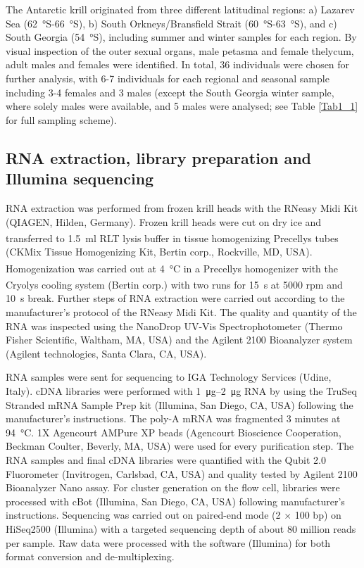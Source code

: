 The Antarctic krill originated from three different latitudinal regions: a)
Lazarev Sea (\SI{62}{\degree}S-\SI{66}{\degree}S), b) South Orkneys/Bransfield
Strait (\SI{60}{\degree}S-\SI{63}{\degree}S), and c) South Georgia
(\SI{54}{\degree}S), including summer and winter samples for each region.  By
visual inspection of the outer sexual organs, male petasma and female thelycum,
adult males and females were identified. In total, 36 individuals were chosen
for further analysis, with 6-7 individuals for each regional and seasonal
sample including 3-4 females and 3 males (except the South Georgia winter
sample, where solely males were available, and 5 males were analysed; see Table
\ref{Tab1_1} for full sampling scheme).

\subsection{RNA extraction, library preparation and Illumina sequencing}

RNA extraction was performed from frozen krill heads with the RNeasy Midi Kit
(QIAGEN, Hilden, Germany). Frozen krill heads were cut on dry ice and
transferred to \SI{1.5}{\milli\litre} RLT lysis buffer in tissue homogenizing
Precellys\textsuperscript{\textregistered} tubes (CKMix Tissue Homogenizing
Kit, Bertin corp., Rockville, MD, USA).  Homogenization was carried out at
\SI{4}{\celsius} in a Precellys\textsuperscript{\textregistered} homogenizer
with the Cryolys\textsuperscript{\textregistered} cooling system (Bertin corp.)
with two runs for \SI{15}{\second} at 5000 rpm and \SI{10}{\second} break.
Further steps of RNA extraction were carried out according to the
manufacturer's protocol of the RNeasy Midi Kit. The quality and quantity of the
RNA was inspected using the NanoDrop UV-Vis
Spectrophotometer (Thermo Fisher Scientific, Waltham, MA, USA) and the Agilent
2100 Bioanalyzer system (Agilent technologies, Santa Clara, CA, USA).

RNA samples were sent for sequencing to IGA Technology Services (Udine, Italy).
cDNA libraries were performed with \SIrange{1}{2}{\micro\gram} RNA by using the
TruSeq Stranded mRNA Sample Prep kit (Illumina, San Diego, CA, USA) following
the manufacturer's instructions. The poly-A mRNA was fragmented 3 minutes at
\SI{94}{\celsius}. 1X Agencourt AMPure XP beads (Agencourt Bioscience
Cooperation, Beckman Coulter, Beverly, MA, USA) were used for every
purification step. The RNA samples and final cDNA libraries were quantified
with the Qubit 2.0 Fluorometer (Invitrogen, Carlsbad, CA, USA) and quality
tested by Agilent 2100 Bioanalyzer Nano assay.  For cluster generation on the
flow cell, libraries were processed with cBot (Illumina, San Diego, CA, USA)
following manufacturer's instructions.  Sequencing was carried out on
paired-end mode (2 $\times$ 100 bp) on HiSeq2500 (Illumina) with a targeted
sequencing depth of about 80 million reads per sample. Raw data were processed
with the software  (Illumina) for both format conversion
and de-multiplexing.

